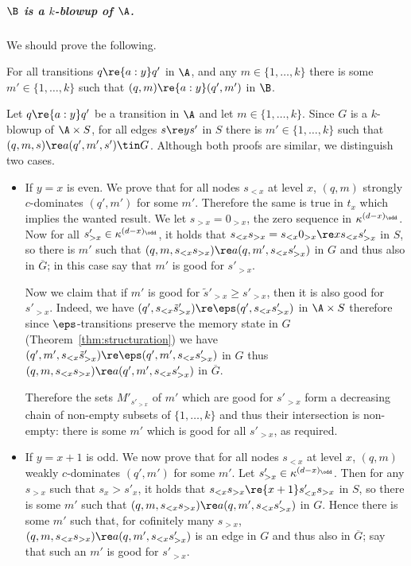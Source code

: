 \subparagraph*{$\B$ is a $k$-blowup of $\A$.}

We should prove the following.

\begin{claim}
    For all transitions $q \re{a:y} q'$ in $\A$, and any $m \in \{1,\dots,k\}$ there is some $m' \in\{1,\dots,k\}$ such that $(q,m) \re{a:y} (q',m')$ in $\B$.
\end{claim}

\begin{claimproof}
Let $q \re{a:y} q'$ be a transition in $\A$ and let $m \in \{1,\dots,k\}$.
Since $G$ is a $k$-blowup of $\A \times S$, for all edges $s\re y s'$ in $S$ there is $m' \in \{1,\dots,k\}$ such that $(q,m,s) \re a (q',m',s') \tin G$.
Although both proofs are similar, we distinguish two cases.
\begin{itemize}
    \item If $y=x$ is even.
    We prove that for all nodes $s_{< x}$ at level $x$, $(q,m)$ strongly $c$-dominates $(q',m')$ for some $m'$.
    Therefore the same is true in $t_x$ which implies the wanted result.
    We let $s_{> x}=0_{> x}$, the zero sequence in $\kappa^{(d-x)_\odd}$.
    Now for all $s'_{>x} \in \kappa^{(d-x)_\odd}$, it holds that $s_{< x} s_{> x} = s_{< x} 0_{> x} \re x s_{< x} s'_{>x}$ in $S$, so there is $m'$ such that $(q,m,s_{< x} s_{>x}) \re a (q,m',s_{< x} s'_{>x})$ in $G$ and thus also in $\overline G$; in this case say that $m'$ is good for $s'_{> x}$.
    
    Now we claim that if $m'$ is good for $\tilde s'_{> x} \geq s'_{> x}$, then it is also good for $s'_{> x}$.
    Indeed, we have $(q',s_{<x}\tilde s'_{> x}) \re \eps (q',s_{<x}s'_{> x})$ in $\A \times S$ therefore since $\eps$-transitions preserve the memory state in $G$ (Theorem~\ref{thm:structuration}) we have $(q',m',s_{<x} \tilde s'_{> x}) \re \eps (q',m',s_{<x} s'_{>x})$ in $G$ thus $(q,m,s_{<x}s_{> x}) \re a (q',m',s_{<x}s'_{> x})$ in $\overline{G}$.

    Therefore the sets $M'_{s'_{> x}}$ of $m'$ which are good for $s'_{> x}$ form a decreasing chain of non-empty subsets of $\{1,\dots,k\}$ and thus their intersection is non-empty: there is some $m'$ which is good for all $s'_{> x}$, as required.

    \item If $y=x+1$ is odd. 
    We now prove that for all nodes $s_{< x}$ at level $x$, $(q,m)$ weakly $c$-dominates $(q',m')$ for some $m'$.
    Let $s'_{> x} \in \kappa^{(d-x)_\odd}$.
    Then for any $s_{> x}$ such that $s_x > s'_x$, it holds that $s_{< x} s_{> x} \re {x+1} s'_{< x} s_{>x}$ in $S$, so there is some $m'$ such that $(q,m,s_{< x} s_{>x}) \re a (q,m',s_{< x} s'_{>x})$ in $G$.
    Hence there is some $m'$ such that, for cofinitely many $s_{> x}$, $(q,m,s_{< x} s_{>x}) \re a (q,m',s_{< x} s'_{>x})$ is an edge in $G$ and thus also in $\overline G$; say that such an $m'$ is good for $s'_{> x}$.


\end{itemize}
\end{claimproof}
